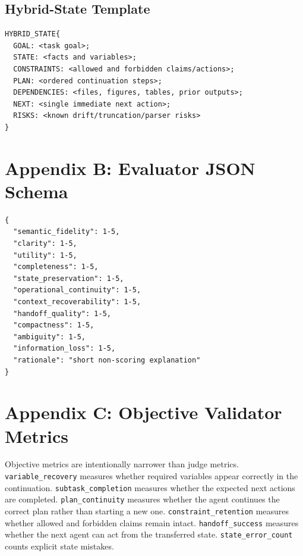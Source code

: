 \documentclass[11pt]{article}
\begin{document}
\subsection{Hybrid-State Template}
\begin{verbatim}
HYBRID_STATE{
  GOAL: <task goal>;
  STATE: <facts and variables>;
  CONSTRAINTS: <allowed and forbidden claims/actions>;
  PLAN: <ordered continuation steps>;
  DEPENDENCIES: <files, figures, tables, prior outputs>;
  NEXT: <single immediate next action>;
  RISKS: <known drift/truncation/parser risks>
}
\end{verbatim}

\section{Appendix B: Evaluator JSON Schema}
\begin{verbatim}
{
  "semantic_fidelity": 1-5,
  "clarity": 1-5,
  "utility": 1-5,
  "completeness": 1-5,
  "state_preservation": 1-5,
  "operational_continuity": 1-5,
  "context_recoverability": 1-5,
  "handoff_quality": 1-5,
  "compactness": 1-5,
  "ambiguity": 1-5,
  "information_loss": 1-5,
  "rationale": "short non-scoring explanation"
}
\end{verbatim}

\section{Appendix C: Objective Validator Metrics}
Objective metrics are intentionally narrower than judge metrics. \texttt{variable\_recovery} measures whether required variables appear correctly in the continuation. \texttt{subtask\_completion} measures whether the expected next actions are completed. \texttt{plan\_continuity} measures whether the agent continues the correct plan rather than starting a new one. \texttt{constraint\_retention} measures whether allowed and forbidden claims remain intact. \texttt{handoff\_success} measures whether the next agent can act from the transferred state. \texttt{state\_error\_count} counts explicit state mistakes.
\end{document}
